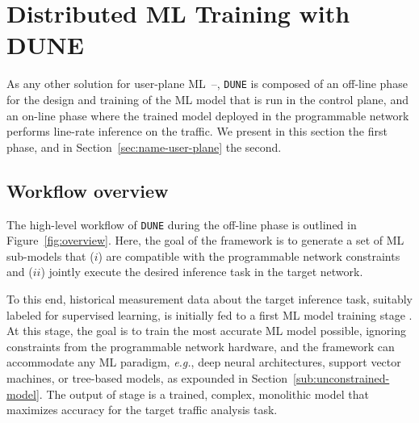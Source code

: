 \documentclass[journal]{IEEEtran}
\theoremstyle{plain} %
\newcommand{\eg}{\textit{e.g.},\xspace}
\newcommand*\numO[1]{\raisebox{.5pt}{\textcircled{\raisebox{-.9pt} {#1}}}}
\newcommand{\name}{\texttt{\fontsize{9}{11}\selectfont DUNE}\xspace}
\begin{document}
%


\section{Distributed ML Training with DUNE}
\label{sec:name-control-plane}

As any other solution for user-plane ML~\cite{jewel-infocom24}--\cite{rids-infocom24}, \name is composed of an off-line phase for the design and training of the ML model that is run in the control plane, and an on-line phase where the trained model deployed in the programmable network performs line-rate inference on the traffic. We present in this section the first phase, and in Section~\ref{sec:name-user-plane} the second.

\subsection{Workflow overview}
\label{sub:overview}

The high-level workflow of \name during the off-line phase is outlined in Figure~\ref{fig:overview}. Here, the goal of the framework is to generate a set of ML sub-models that ($i$) are compatible with the programmable network  constraints and ($ii$) jointly execute the desired inference task in the target network.

To this end, historical measurement data about the target inference task, suitably labeled for supervised learning, is initially fed to a first ML model training stage \numO{1}. At this stage, the goal is to train the most accurate ML model possible, ignoring constraints from the programmable network hardware, and the framework can accommodate any ML paradigm, \eg deep neural architectures, support vector machines, or tree-based models, as expounded in Section~\ref{sub:unconstrained-model}. The output of stage \numO{1} is a trained, complex, monolithic model that maximizes accuracy for the target traffic analysis task.
\end{document}
